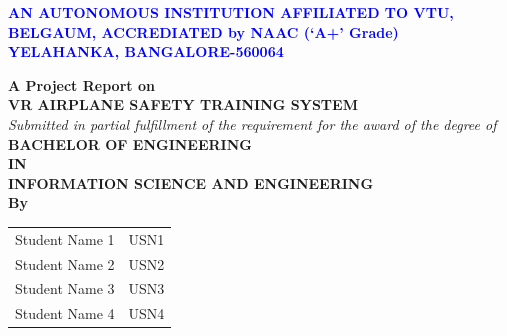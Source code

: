 \documentclass[12pt,a4paper,twoside,openright,one column,notitlepage]{report}
\begin{document}
	\begin{titlepage}
		
		\begin{center}
			\vspace{0.3cm}
			\scriptsize{\textbf{\textcolor{blue}{AN AUTONOMOUS INSTITUTION AFFILIATED TO VTU, BELGAUM, ACCREDIATED by NAAC (‘A+’ Grade)}}}\\
			\vspace{0.3cm}
			\scriptsize{\textbf{\textcolor{blue}{YELAHANKA, BANGALORE-560064}}}
			\vspace{0.2cm}
			
			\center
			
			
			\vspace{0.2cm}
        \large \textbf{A Project Report on}\\
        \vspace{0.2cm} 
        \textbf{VR AIRPLANE SAFETY TRAINING SYSTEM}\\
        \vspace{0.2cm}
        \small \textit{Submitted in partial fulfillment of the requirement for the award of the degree of}\\
        \vspace{0.2cm}
        \large \textbf{BACHELOR OF ENGINEERING}\\
        \vspace{0.2cm}
        \large \textbf{IN}\\
        \vspace{0.2cm}
        \large \textbf{INFORMATION SCIENCE AND ENGINEERING}\\
        \vspace{0.2cm}
        \large \textbf{By}\\
        \setlength{\tabcolsep}{4em}
	
	\begin{tabular}{l    r}\vspace{0.1cm}
	Student Name 1&USN1\\\vspace{0.1cm}
	Student Name 2&USN2\\\vspace{0.1cm}
    Student Name 3&USN3\\\vspace{0.1cm}
    Student Name 4&USN4\\
	\end{tabular}	


\end{center}
\end{titlepage}
\end{document}
